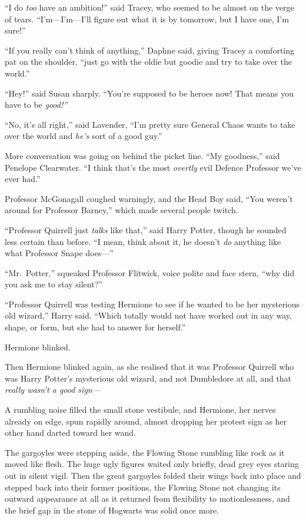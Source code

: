 ``I do \emph{too} have an ambition!'' said Tracey, who seemed to be
almost on the verge of tears. ``I'm---I'm---I'll figure out what it is
by tomorrow, but I have one, I'm sure!''

``If you really can't think of anything,'' Daphne said, giving Tracey a
comforting pat on the shoulder, ``just go with the oldie but goodie and
try to take over the world.''

``Hey!'' said Susan sharply. ``You're supposed to be heroes now! That
means you have to be \emph{good!''}

``No, it's all right,'' said Lavender, ``I'm pretty sure General Chaos
wants to take over the world and \emph{he's} sort of a good guy.''

More conversation was going on behind the picket line. ``My goodness,''
said Penelope Clearwater. ``I think that's the most \emph{overtly} evil
Defence Professor we've ever had.''

Professor McGonagall coughed warningly, and the Head Boy said, ``You
weren't around for Professor Barney,'' which made several people twitch.

``Professor Quirrell just \emph{talks} like that,'' said Harry Potter,
though he sounded less certain than before. ``I mean, think about it, he
doesn't \emph{do} anything like what Professor Snape does---''

``Mr.~Potter,'' squeaked Professor Flitwick, voice polite and face
stern, ``why did you ask me to stay silent?''

``Professor Quirrell was testing Hermione to see if he wanted to be her
mysterious old wizard,'' Harry said. ``Which totally would not have
worked out in any way, shape, or form, but she had to answer for
herself.''

Hermione blinked.

Then Hermione blinked again, as she realised that it was Professor
Quirrell who was Harry Potter's mysterious old wizard, and not
Dumbledore at all, and that \emph{really wasn't a good sign---}

A rumbling noise filled the small stone vestibule, and Hermione, her
nerves already on edge, spun rapidly around, almost dropping her protest
sign as her other hand darted toward her wand.

The gargoyles were stepping aside, the Flowing Stone rumbling like rock
as it moved like flesh. The huge ugly figures waited only briefly, dead
grey eyes staring out in silent vigil. Then the great gargoyles folded
their wings back into place and stepped back into their former
positions, the Flowing Stone not changing its outward appearance at all
as it returned from flexibility to motionlessness, and the brief gap in
the stone of Hogwarts was solid once more.

